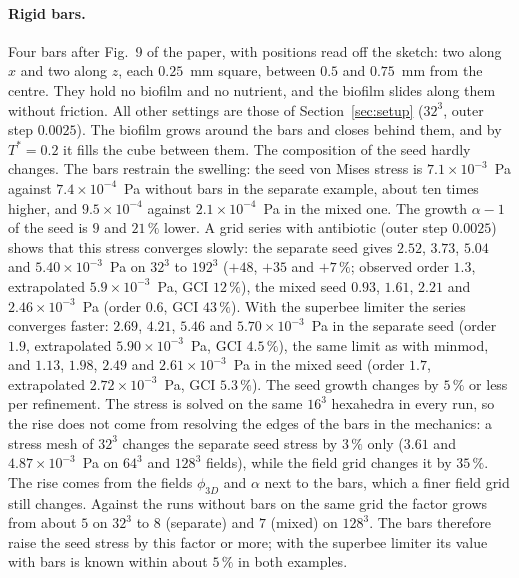 \documentclass[11pt,a4paper]{article}
\newcommand{\phiD}{\phi_{3D}}
\begin{document}
\paragraph{Rigid bars.} Four bars after Fig.~9 of the paper, with positions read off the sketch: two along $x$ and two along $z$, each $0.25$~mm square, between $0.5$ and $0.75$~mm from the centre. They hold no biofilm and no nutrient, and the biofilm slides along them without friction. All other settings are those of Section~\ref{sec:setup} ($32^3$, outer step $0.0025$). The biofilm grows around the bars and closes behind them, and by $T^*=0.2$ it fills the cube between them. The composition of the seed hardly changes. The bars restrain the swelling: the seed von Mises stress is $7.1\times10^{-3}$~Pa against $7.4\times10^{-4}$~Pa without bars in the separate example, about ten times higher, and $9.5\times10^{-4}$ against $2.1\times10^{-4}$~Pa in the mixed one. The growth $\alpha-1$ of the seed is $9$ and $21\,\%$ lower. A grid series with antibiotic (outer step $0.0025$) shows that this stress converges slowly: the separate seed gives $2.52$, $3.73$, $5.04$ and $5.40\times10^{-3}$~Pa on $32^3$ to $192^3$ ($+48$, $+35$ and $+7\,\%$; observed order $1.3$, extrapolated $5.9\times10^{-3}$~Pa, GCI $12\,\%$), the mixed seed $0.93$, $1.61$, $2.21$ and $2.46\times10^{-3}$~Pa (order $0.6$, GCI $43\,\%$). With the superbee limiter the series converges faster: $2.69$, $4.21$, $5.46$ and $5.70\times10^{-3}$~Pa in the separate seed (order $1.9$, extrapolated $5.90\times10^{-3}$~Pa, GCI $4.5\,\%$), the same limit as with minmod, and $1.13$, $1.98$, $2.49$ and $2.61\times10^{-3}$~Pa in the mixed seed (order $1.7$, extrapolated $2.72\times10^{-3}$~Pa, GCI $5.3\,\%$). The seed growth changes by $5\,\%$ or less per refinement. The stress is solved on the same $16^3$ hexahedra in every run, so the rise does not come from resolving the edges of the bars in the mechanics: a stress mesh of $32^3$ changes the separate seed stress by $3\,\%$ only ($3.61$ and $4.87\times10^{-3}$~Pa on $64^3$ and $128^3$ fields), while the field grid changes it by $35\,\%$. The rise comes from the fields $\phiD$ and $\alpha$ next to the bars, which a finer field grid still changes. Against the runs without bars on the same grid the factor grows from about $5$ on $32^3$ to $8$ (separate) and $7$ (mixed) on $128^3$. The bars therefore raise the seed stress by this factor or more; with the superbee limiter its value with bars is known within about $5\,\%$ in both examples.
\end{document}
